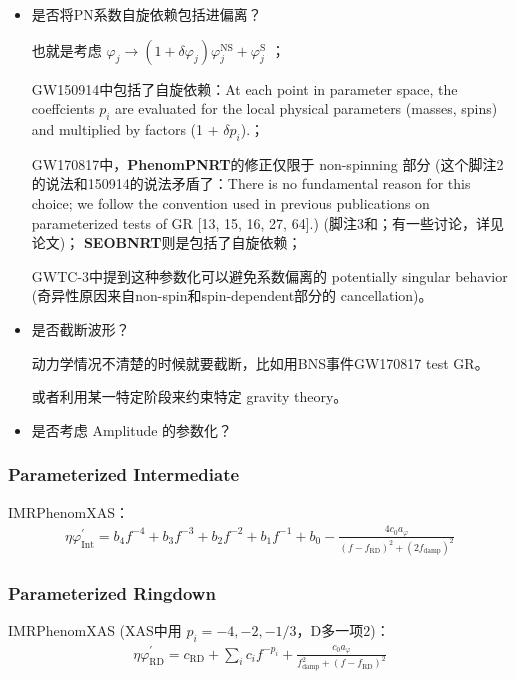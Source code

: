 \documentclass[CJK]{paper}  %
\begin{document}
\begin{itemize}
	\item[3. ] 是否将PN系数自旋依赖包括进偏离？
		\par 也就是考虑 $\varphi_j \longrightarrow (1 + \delta\varphi_j)\varphi_j^\text{NS} + \varphi_j^\text{S}$ \cite{test_GR_BBH_O1}；
		\par GW150914\cite{test_GR_GW150914}中包括了自旋依赖：At each point in parameter space,
			the coeffcients $p_i$ are evaluated for the local physical parameters (masses, spins)
			and multiplied by factors (1 + $\delta \hat{p}_i$).；
		\par GW170817\cite{test_GR_GW170817}中，\textbf{PhenomPNRT}的修正仅限于 non-spinning 部分
			(这个脚注2的说法和150914的说法矛盾了：There is no fundamental reason for this choice;
			we follow the convention used in previous publications on parameterized tests of GR [13, 15, 16, 27, 64].)
			(脚注3和；有一些讨论，详见论文)；
			\textbf{SEOBNRT}则是包括了自旋依赖；
		\par GWTC-3\cite{test_GR_GWTC3}中提到这种参数化可以避免系数偏离的 potentially singular behavior (奇异性原因来自non-spin和spin-dependent部分的 cancellation)。
	\item[4. ] 是否截断波形？
		\par 动力学情况不清楚的时候就要截断，比如用BNS事件GW170817 test GR\cite{test_GR_GW170817}。
		\par 或者利用某一特定阶段来约束特定 gravity theory。
	\item[5. ] 是否考虑 Amplitude 的参数化？
\end{itemize}


\subsubsection{Parameterized Intermediate}
IMRPhenomXAS：
\begin{align}
	\eta \varphi_\text{Int}^\prime = b_4f^{-4} + b_3f^{-3} + b_2f^{-2} + b_1f^{-1} + b_0 - \frac{4 c_0 a_\varphi}{(f-f_\text{RD})^2 + (2f_\text{damp})^2}
\end{align}

\subsubsection{Parameterized Ringdown}

IMRPhenomXAS (XAS中用 $p_i = -4, -2, -1/3$，D多一项$2$)：
\begin{align}
	\eta \varphi_\text{RD}^\prime = c_\text{RD} + \sum_i c_i f^{-p_i} + \frac{c_0 a_\varphi}{f_\text{damp}^2 + (f-f_\text{RD})^2}
\end{align}
\end{document}
